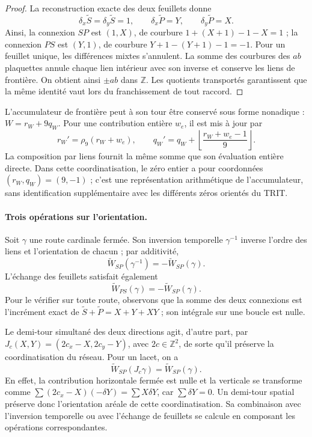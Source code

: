 \begin{proof}
La reconstruction exacte des deux feuillets donne
\[
 \delta_x\widetilde S=\delta_y\widetilde S=1,
 \qquad\delta_x\widetilde P=Y,
 \qquad\delta_y\widetilde P=X.
\]
Ainsi, la connexion $SP$ est $(1,X)$, de courbure
$1+(X+1)-1-X=1$ ; la connexion $PS$ est $(Y,1)$, de courbure
$Y+1-(Y+1)-1=-1$. Pour un feuillet unique, les différences
mixtes s'annulent. La somme des courbures des $ab$ plaquettes annule chaque
lien intérieur avec son inverse et conserve les liens de frontière.
On obtient ainsi $\pm ab$ dans $\mathbb Z$. Les quotients transportés
garantissent que la même identité vaut lors du franchissement de tout raccord.
\end{proof}

L'accumulateur de frontière peut à son tour être conservé sous forme nonadique :
$W=r_W+9q_W$. Pour une contribution entière $w_e$, il est mis à jour par
\[
 r_W'=\rho_9(r_W+w_e),\qquad
 q_W'=q_W+\left\lfloor\frac{r_W+w_e-1}{9}\right\rfloor.
\]
La composition par liens fournit la même somme que son évaluation
entière directe. Dans cette coordinatisation, le zéro entier a pour coordonnées
$(r_W,q_W)=(9,-1)$ ; c’est une représentation arithmétique de l’accumulateur,
sans identification supplémentaire avec les différents zéros orientés du TRIT.

\paragraph{Trois opérations sur l'orientation.}
Soit $\gamma$ une route cardinale fermée. Son inversion temporelle
$\gamma^{-1}$ inverse l'ordre des liens et l'orientation de chacun ;
par additivité,
\[
 \widetilde W_{SP}(\gamma^{-1})=-\widetilde W_{SP}(\gamma).
\]
L'échange des feuillets satisfait également
\[
 \widetilde W_{PS}(\gamma)=-\widetilde W_{SP}(\gamma).
\]
Pour le vérifier sur toute route, observons que la somme des deux
connexions est l'incrément exact de
$\widetilde S+\widetilde P=X+Y+XY$ ; son intégrale sur une boucle est nulle.

Le demi-tour simultané des deux directions agit, d’autre part,
par $J_c(X,Y)=(2c_x-X,2c_y-Y)$, avec $2c\in\mathbb Z^2$,
de sorte qu’il préserve la coordinatisation du réseau. Pour un lacet, on a
\[
 \widetilde W_{SP}(J_c\gamma)=\widetilde W_{SP}(\gamma).
\]
En effet, la contribution horizontale fermée est nulle et la verticale
se transforme comme
$\sum (2c_x-X)(-\delta Y)=\sum X\delta Y$, car
$\sum\delta Y=0$. Un demi-tour spatial préserve donc
l’orientation aréale de cette coordinatisation. Sa combinaison avec l’inversion temporelle
ou avec l’échange de feuillets se calcule en composant les opérations
correspondantes.

